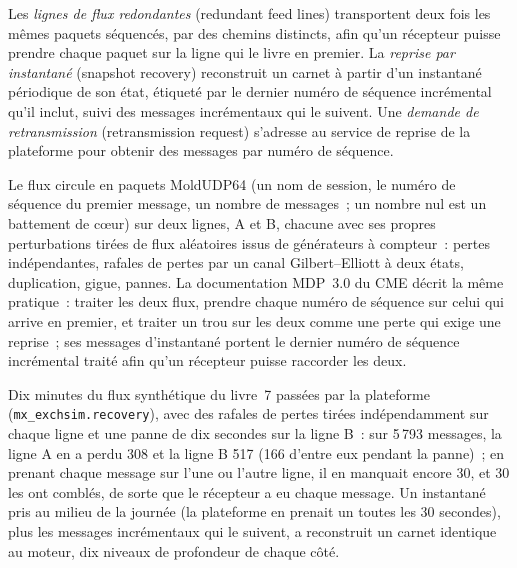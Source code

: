 \begin{definition}\label{def:mx:build-a-matching-engine-and-exchange-simulator:feed}
Les \emph{lignes de flux redondantes} (redundant feed lines) transportent deux fois les mêmes paquets séquencés, par des chemins distincts, afin qu'un récepteur puisse prendre chaque paquet
sur la ligne qui le livre en premier. La \emph{reprise par instantané} (snapshot recovery) reconstruit un carnet à partir d'un instantané périodique de son état, étiqueté
par le dernier numéro de séquence incrémental qu'il inclut, suivi des messages incrémentaux qui le suivent. Une \emph{demande de retransmission} (retransmission request) s'adresse au
service de reprise de la plateforme pour obtenir des messages par numéro de séquence.
\end{definition}

Le flux circule en paquets MoldUDP64 (un nom de session, le numéro de séquence du premier message, un nombre de messages~; un nombre nul est un battement de cœur) sur deux
lignes, A et B, chacune avec ses propres perturbations tirées de flux aléatoires issus de générateurs à compteur~: pertes indépendantes, rafales de pertes par un canal Gilbert--Elliott
à deux états, duplication, gigue, pannes. La documentation MDP~3.0 du CME décrit la même pratique~: traiter les deux flux, prendre chaque numéro de séquence
sur celui qui arrive en premier, et traiter un trou sur les deux comme une perte qui exige une reprise~; ses messages d'instantané portent le dernier numéro de séquence incrémental traité
afin qu'un récepteur puisse raccorder les deux.

Dix minutes du flux synthétique du livre~7 passées par la plateforme (\texttt{mx\_exchsim.recovery}), avec des rafales de pertes tirées indépendamment sur chaque ligne et une
panne de dix secondes sur la ligne B~: sur 5\,793 messages, la ligne A en a perdu 308 et la ligne B 517 (166 d'entre eux pendant la panne)~; en prenant chaque message sur l'une ou l'autre ligne, il en manquait encore 30, et 30  les ont comblés,
de sorte que le récepteur a eu chaque message. Un instantané pris au milieu de la journée (la plateforme en prenait un toutes les 30 secondes), plus les messages incrémentaux qui le suivent,
a reconstruit un carnet identique au moteur, dix niveaux de profondeur de chaque côté.

